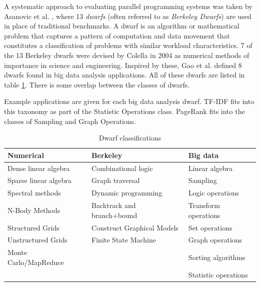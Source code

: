 \documentclass{uit-report}
\begin{document}
A systematic approach to evaluating parallel programming systems was taken by Asanovic et al. \cite{dwarfs}, where 13 \emph{dwarfs} (often referred to as \emph{Berkeley Dwarfs}) are used in place of traditional benchmarks. A dwarf is an algorithm or mathematical problem that captures a pattern of computation and data movement that constitutes a classification of problems with similar workload characteristics. 7 of the 13 Berkeley dwarfs were devised by Colella \cite{colella} in 2004 as numerical methods of importance in science and engineering. Inspired by these, Gao et al. \cite{datadwarfs} defined 8 dwarfs found in big data analysis applications. All of these dwarfs are listed in table \ref{table:dwarfs}. There is some overlap between the classes of dwarfs.

Example applications are given for each big data analysis dwarf. TF-IDF fits into this taxonomy as part of the Statistic Operations class. PageRank fits into the classes of Sampling and Graph Operations.

\vskip 0.9cm
\begin{table}[h]
	\begin{center}
		
		\setlength\arrayrulewidth{1pt}
		\renewcommand{\arraystretch}{2}
		\begin{tabular}{ | p{4cm} | p{4cm} | p{4cm} |}
			\hline
			\textbf{Numerical} & \textbf{Berkeley} & \textbf{Big data}\\ \hline
			Dense linear algebra & Combinational logic & Linear algebra \\ \hline
			Sparse linear algebra & Graph traversal &  Sampling \\ \hline
			Spectral methods & Dynamic programming &  Logic operations \\ \hline
			N-Body Methods & Backtrack and branch+bound &  Transform operations \\ \hline
			Structured Grids & Construct Graphical Models &  Set operations \\ \hline
			Unstructured Grids & Finite State Machine &  Graph operations \\ \hline
			Monte Carlo/MapReduce &  &  Sorting algorithms\\ \hline
			 &  &  Statistic operations\\ \hline
		\end{tabular}
		\caption{Dwarf classifications}
		\label{table:dwarfs}
		
	\end{center}
\end{table}
\end{document}
